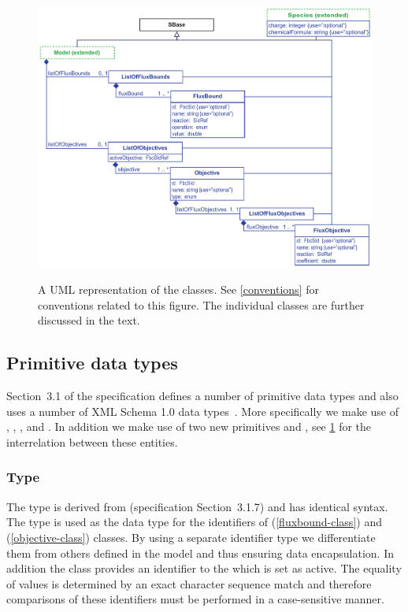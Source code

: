 \begin{figure}[h]
  \centering
  \includegraphics[width=\textwidth]{images/fbc_uml.pdf}\\
  \caption{A UML representation of the \FBCPackage classes. See \ref{conventions} for conventions related to this figure. The individual classes are further discussed in the text.} 
  \label{fig:fbc_uml}
\end{figure}

\subsection{Primitive data types}
\label{primtypes}
Section~3.1 of the \sbmlthreecore specification defines a number of
primitive data types and also uses a number of XML Schema 1.0 data
types~\citep{biron:2000}.  More specifically we make use of , , ,  and . In addition we make use of two new primitives  and , see \ref{fig:fbc_uml} for the interrelation between these entities.

\subsubsection{Type }
\label{primtype-fbcsid}

The type  is derived from  (\sbmlthreecore specification Section~3.1.7) and has identical syntax. The  type is used as the data type for the identifiers of \FluxBound (\ref{fluxbound-class}) and \Objective (\ref{objective-class}) classes. By using a separate identifier type we differentiate them from others defined in the \SBML model and thus ensuring data encapsulation. In addition the \Objective class  provides an identifier to the \Objective which is set as active. The equality of  values is determined by an exact character sequence match and therefore comparisons of these identifiers must be performed in a case-sensitive manner.

